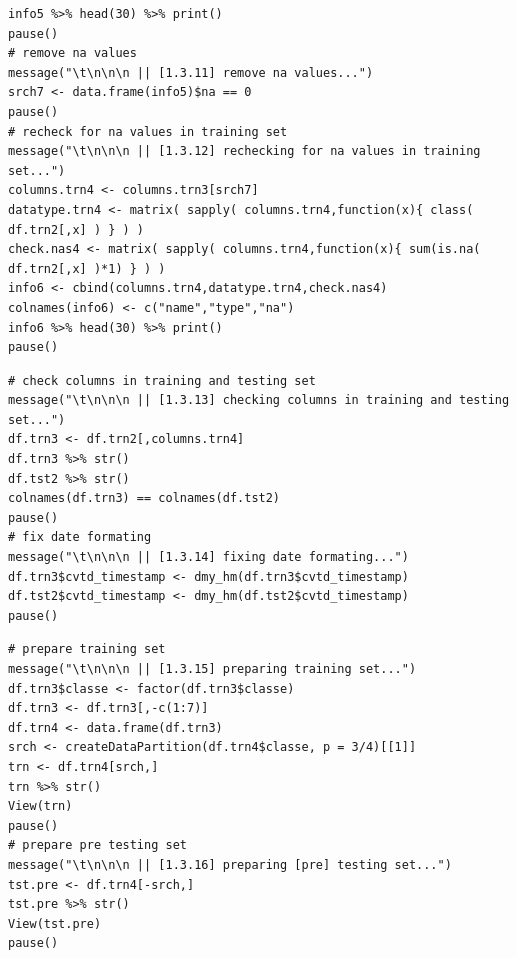 \documentclass[10pt, twoside]{article}
\begin{document}
\begin{verbatim}
info5 %>% head(30) %>% print()
pause()
# remove na values
message("\t\n\n\n || [1.3.11] remove na values...")
srch7 <- data.frame(info5)$na == 0
pause()
# recheck for na values in training set
message("\t\n\n\n || [1.3.12] rechecking for na values in training set...")
columns.trn4 <- columns.trn3[srch7]
datatype.trn4 <- matrix( sapply( columns.trn4,function(x){ class( df.trn2[,x] ) } ) )
check.nas4 <- matrix( sapply( columns.trn4,function(x){ sum(is.na( df.trn2[,x] )*1) } ) )
info6 <- cbind(columns.trn4,datatype.trn4,check.nas4)
colnames(info6) <- c("name","type","na")
info6 %>% head(30) %>% print()
pause()
\end{verbatim}

\begin{verbatim}
# check columns in training and testing set
message("\t\n\n\n || [1.3.13] checking columns in training and testing set...")
df.trn3 <- df.trn2[,columns.trn4]
df.trn3 %>% str()
df.tst2 %>% str()
colnames(df.trn3) == colnames(df.tst2)
pause()
# fix date formating
message("\t\n\n\n || [1.3.14] fixing date formating...")
df.trn3$cvtd_timestamp <- dmy_hm(df.trn3$cvtd_timestamp)
df.tst2$cvtd_timestamp <- dmy_hm(df.tst2$cvtd_timestamp)
pause()
\end{verbatim}

\begin{verbatim}
# prepare training set
message("\t\n\n\n || [1.3.15] preparing training set...")
df.trn3$classe <- factor(df.trn3$classe)
df.trn3 <- df.trn3[,-c(1:7)]
df.trn4 <- data.frame(df.trn3)
srch <- createDataPartition(df.trn4$classe, p = 3/4)[[1]]
trn <- df.trn4[srch,]
trn %>% str()
View(trn)
pause()
# prepare pre testing set
message("\t\n\n\n || [1.3.16] preparing [pre] testing set...")
tst.pre <- df.trn4[-srch,]
tst.pre %>% str()
View(tst.pre)
pause()
\end{verbatim}
\end{document}
